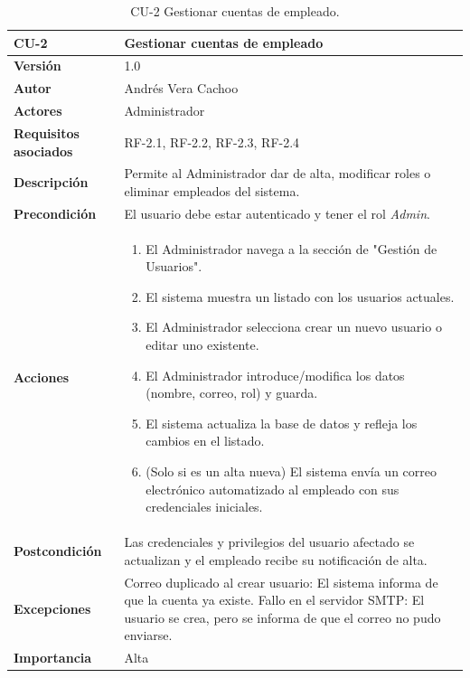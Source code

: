 \begin{table}[H]
	\centering
	\begin{tabularx}{\linewidth}{ p{} p{} }
		\toprule
		\textbf{CU-2}    & \textbf{Gestionar cuentas de empleado}\\
		\toprule
		\textbf{Versión}              & 1.0    \\
		\textbf{Autor}                & Andrés Vera Cachoo \\
		\textbf{Actores}              & Administrador \\
		\textbf{Requisitos asociados} & RF-2.1, RF-2.2, RF-2.3, RF-2.4 \\
		\textbf{Descripción}          & Permite al Administrador dar de alta, modificar roles o eliminar empleados del sistema. \\
		\textbf{Precondición}         & El usuario debe estar autenticado y tener el rol \textit{Admin}. \\
		\textbf{Acciones}             &
		\begin{enumerate}
			\def\labelenumi{\arabic{enumi}.}
			\tightlist
			\item El Administrador navega a la sección de "Gestión de Usuarios".
			\item El sistema muestra un listado con los usuarios actuales.
			\item El Administrador selecciona crear un nuevo usuario o editar uno existente.
            \item El Administrador introduce/modifica los datos (nombre, correo, rol) y guarda.
            \item El sistema actualiza la base de datos y refleja los cambios en el listado.
            \item (Solo si es un alta nueva) El sistema envía un correo electrónico automatizado al empleado con sus credenciales iniciales.
		\end{enumerate}\\
		\textbf{Postcondición}        & Las credenciales y privilegios del usuario afectado se actualizan y el empleado recibe su notificación de alta. \\
		\textbf{Excepciones}          & Correo duplicado al crear usuario: El sistema informa de que la cuenta ya existe. Fallo en el servidor SMTP: El usuario se crea, pero se informa de que el correo no pudo enviarse. \\
		\textbf{Importancia}          & Alta \\
		\bottomrule
	\end{tabularx}
	\caption{CU-2 Gestionar cuentas de empleado.}
\end{table}


